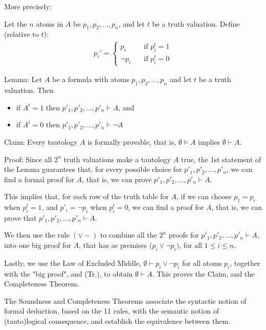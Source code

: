 \documentclass{article}
\begin{document}
More precisely:

Let the $n$ atoms in $A$ be $p_1, p_2, \ldots, p_n$, and let $t$ be a truth valuation. Define (relative to $t$):
\begin{align*}
p_i' = \begin{cases}
p_i \quad &\text{if } p_i^t = 1 \\
\neg p_i \quad &\text{if } p_i^t = 0
\end{cases}
\end{align*}


Lemma: Let $A$ be a formula with atoms $p_1, p_2, \ldots, p_n$ and let $t$ be a truth valuation. Then
\begin{itemize}
    \item if $A^t = 1$ then $p'_1, p'_2, \ldots, p'_n \vdash A$, and \\
    \item if $A^t = 0$ then $p'_1, p'_2, \ldots, p'_n \vdash \neg A$
\end{itemize}

Claim: Every tautology $A$ is formally provable, that is, $\emptyset \vDash A$ implies $\emptyset \vdash A$.

Proof: Since all $2^n$ truth valuations make a tautology $A$ true, the 1st statement of the Lemma guarantees that, for every possible choice for $p'_1, p'_2, \ldots, p'_n$, we can find a formal proof for $A$, that is, we can prove $p'_1, p'_2, \ldots, p'_n \vdash A$.

This implies that, for each row of the truth table for $A$, if we can choose $p
_1 = p_i$ when $p^t_i = 1$, and $p'_i = \neg p_i$ when $p_i^t = 0$, we can find a proof for $A$, that is, we can prove that $p'_1, p'_2, \ldots, p'_n \vdash A$.

We then use the rule $(\vee -)$ to combine all the $2^n$ proofs for $p'_1, p'_2, \ldots, p'_n \vdash A$, into one big proof for $A$, that has as premises ($p_i \vee \neg p_i)$, for all $1 \le i \le n$. 

Lastly, we use the Law of Excluded Middle, $\emptyset \vdash p_i \vee \neg p_i$ for all atoms $p_i$, together with the "big proof", and (Tr.), to obtain $\emptyset \vdash A$. This proves the Claim, and the Completeness Theorem.



The Soundness and Completeness Theorems associate the syntactic notion of formal deduction, based on the 11 rules, with the semantic notion of (tauto)logical consequence, and establish the equivalence between them. 
\end{document}
